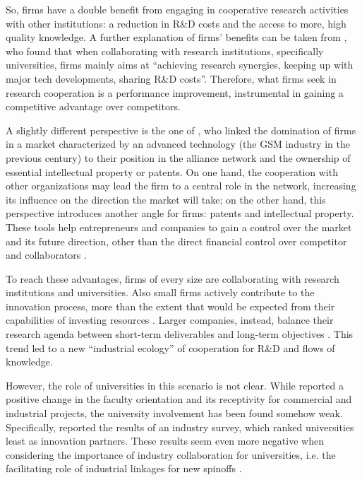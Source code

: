 So, firms have a double benefit from engaging in cooperative research activities with other institutions: a reduction in R\&D costs and the access to more, high quality knowledge. A further explanation of firms' benefits can be taken from \citet{Caloghirou2001}, who found that when collaborating with research institutions, specifically universities, firms mainly aims at \enquote{achieving research synergies, keeping up with major tech developments, sharing R\&D costs}. Therefore, what firms seek in research cooperation is a performance improvement, instrumental in gaining a competitive advantage over competitors. 

A slightly different perspective is the one of \citet{Bekkers2002}, who linked the domination of firms in a market characterized by an advanced technology (the GSM industry in the previous century) to their position in the alliance network and the ownership of essential intellectual property or patents. On one hand, the cooperation with other organizations may lead the firm to a central role in the network, increasing its influence on the direction the market will take; on the other hand, this perspective introduces another angle for firms: patents and intellectual property. These tools help entrepreneurs and companies to gain a control over the market and its future direction, other than the direct financial control over competitor and collaborators \citep{Siegel2003a}. 

To reach these advantages, firms of every size are collaborating with research institutions and universities. Also small firms actively contribute to the innovation process, more than the extent that would be expected from their capabilities of investing resources \citep{Audretsch2005}. Larger companies, instead, balance their research agenda between short-term deliverables and long-term objectives \citep{Tijssen2006}. This trend led to a new \enquote{industrial ecology} of cooperation for R\&D and flows of knowledge.

However, the role of universities in this scenario is not clear. While \citet{Thursby2002} reported a positive change in the faculty orientation and its receptivity for commercial and industrial projects, the university involvement has been found somehow weak. Specifically, \citet{Yusuf2008} reported the results of an industry survey, which ranked universities least as innovation partners. These results seem even more negative when considering the importance of industry collaboration for universities, i.e. the facilitating role of industrial linkages for new spinoffs \citep{OShea2005}.

